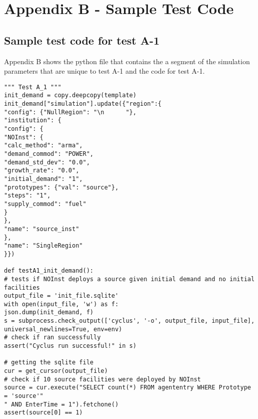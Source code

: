 \documentclass[11pt,letterpaper]{article}
\begin{document}
\section{Appendix B - Sample Test Code }
\subsection*{Sample test code for test A-1}
Appendix B shows the python file that contains the a segment of the simulation parameters that are unique to test A-1 and the code for test A-1. 
\begin{verbatim}
""" Test A_1 """
init_demand = copy.deepcopy(template)
init_demand["simulation"].update({"region":{
"config": {"NullRegion": "\n      "}, 
"institution": {
"config": {
"NOInst": {
"calc_method": "arma", 
"demand_commod": "POWER", 
"demand_std_dev": "0.0", 
"growth_rate": "0.0", 
"initial_demand": "1", 
"prototypes": {"val": "source"}, 
"steps": "1", 
"supply_commod": "fuel"
}
}, 
"name": "source_inst"
}, 
"name": "SingleRegion"
}})

def testA1_init_demand():
# tests if NOInst deploys a source given initial demand and no initial facilities
output_file = 'init_file.sqlite'
with open(input_file, 'w') as f:
json.dump(init_demand, f)
s = subprocess.check_output(['cyclus', '-o', output_file, input_file],
universal_newlines=True, env=env)
# check if ran successfully
assert("Cyclus run successful!" in s)

# getting the sqlite file
cur = get_cursor(output_file)
# check if 10 source facilities were deployed by NOInst
source = cur.execute("SELECT count(*) FROM agententry WHERE Prototype = 'source'"
" AND EnterTime = 1").fetchone()
assert(source[0] == 1)
\end{verbatim}
\end{document}
